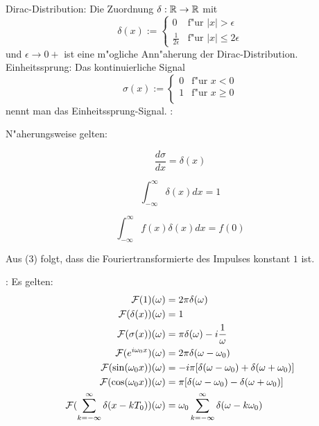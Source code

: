  Dirac-Distribution:{
  Die Zuordnung $\delta:\mathbb R\to\mathbb R$ mit
  \[
    \delta(x):=\begin{cases}
      0 & \text{f"ur $|x|>\epsilon$} \\
      \frac 1 {2\epsilon} & \text {f"ur $|x|\le 2\epsilon$} 
    \end{cases}
  \]
  und $\epsilon\to 0+$ ist eine m"ogliche Ann"aherung der Dirac-Distribution.
}
 Einheitssprung:{
  Das kontinuierliche Signal
  \[
    \sigma(x):=\begin{cases}
      0 & \text{f"ur $x<0$} \\
      1 & \text{f"ur $x\ge 0$} \\
    \end{cases}
  \]
  nennt man das Einheitssprung-Signal.
}
\remark:{
  N"aherungsweise gelten:
  \begin{stmts}
    \item \[ \frac {d\sigma}{dx}=\delta(x) \]
    \item \[ \int_{-\infty}^\infty \delta(x) dx = 1 \]
    \item \[ \int_{-\infty}^\infty f(x)\delta(x) dx = f(0) \]
  \end{stmts}
  Aus (3) folgt, dass die Fouriertransformierte des Impulses 
  konstant $1$ ist.
}
\example:{
  Es gelten:
  \begin{align*}
    \FT(1)(\omega) &= 2\pi \delta(\omega) \\
    \FT(\delta(x))(\omega) &= 1 \\
    \FT(\sigma(x))(\omega) &= \pi \delta(\omega)-i\frac 1 \omega \\    
    \FT(e^{i\omega_0 x})(\omega) &= 2\pi\delta(\omega-\omega_0) \\
    \FT(\sin(\omega_0 x))(\omega) &= -i\pi [\delta(\omega-\omega_0)+\delta(\omega+\omega_0)] \\
    \FT(\cos(\omega_0 x))(\omega) &= \pi [\delta(\omega-\omega_0)-\delta(\omega+\omega_0)] \\
    \FT(\sum_{k=-\infty}^\infty \delta(x-kT_0))(\omega) &=
      \omega_0 \sum_{k=-\infty}^\infty \delta(\omega-k\omega_0) \\
  \end{align*}
}
